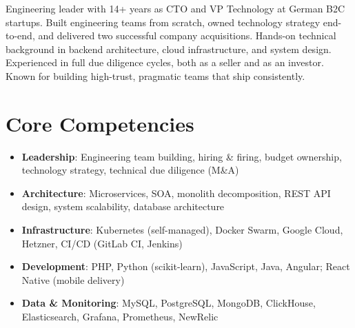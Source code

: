 \documentclass[11pt,a4paper,sans]{moderncv}
\begin{document}
\makecvtitle


\vspace{6pt}
\small{Engineering leader with 14+ years as CTO and VP Technology at German B2C startups. Built engineering teams from scratch, owned technology strategy end-to-end, and delivered two successful company acquisitions. Hands-on technical background in backend architecture, cloud infrastructure, and system design. Experienced in full due diligence cycles, both as a seller and as an investor. Known for building high-trust, pragmatic teams that ship consistently.}


\section{Core Competencies}
\vspace{1pt}
\begin{itemize}

\item \textbf{Leadership}: Engineering team building, hiring \& firing, budget ownership, technology strategy, technical due diligence (M\&A)

\item \textbf{Architecture}: Microservices, SOA, monolith decomposition, REST API design, system scalability, database architecture

\item \textbf{Infrastructure}: Kubernetes (self-managed), Docker Swarm, Google Cloud, Hetzner, CI/CD (GitLab CI, Jenkins)

\item \textbf{Development}: PHP, Python (scikit-learn), JavaScript, Java, Angular; React Native (mobile delivery)

\item \textbf{Data \& Monitoring}: MySQL, PostgreSQL, MongoDB, ClickHouse, Elasticsearch, Grafana, Prometheus, NewRelic

\end{itemize}

\end{document}
